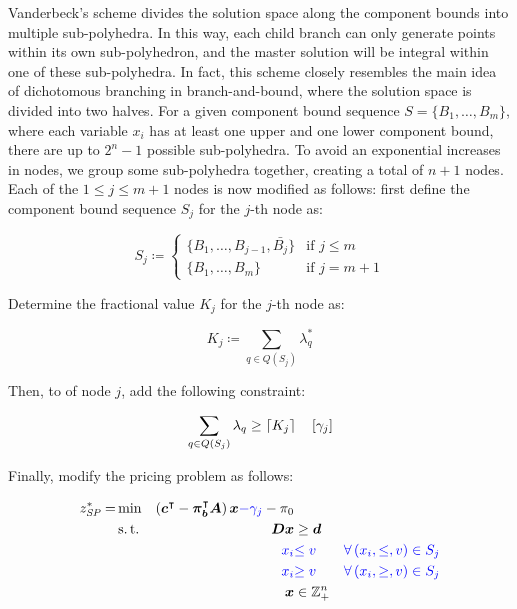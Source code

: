 Vanderbeck's scheme divides the solution space along the component bounds into multiple sub-polyhedra. In this way, each child branch can only generate points within its own sub-polyhedron, and the master solution will be integral within one of these sub-polyhedra. In fact, this scheme closely resembles the main idea of dichotomous branching in branch-and-bound, where the solution space is divided into two halves. For a given component bound sequence $S = \{B_1, \dots, B_m\}$, where each variable $x_i$ has at least one upper and one lower component bound, there are up to $2^n - 1$ possible sub-polyhedra. To avoid an exponential increases in nodes, we group some sub-polyhedra together, creating a total of $n + 1$ nodes. Each of the $1 \leq j \leq m+1$ nodes is now modified as follows: first define the component bound sequence $S_j$ for the $j$-th node as:

\begin{equation}
S_j \coloneqq
\begin{cases}
\{B_1, \dots, B_{j-1}, \bar{B_j}\} & \text{if } j \leq m \\
\{B_1, \dots, B_m\} & \text{if } j = m+1
\end{cases}
\end{equation}

Determine the fractional value $K_j$ for the $j$-th node as:

\begin{equation}
K_j \coloneqq \sum_{q \in Q(S_j)} \lambda_q^*
\end{equation}

Then, to \RMP{} of node $j$, add the following constraint:

\begin{equation}
\sum_{q \in Q(S_j)} \lambda_q \geq \lceil K_j\rceil \quad \left[\gamma_j\right]
\end{equation}

Finally, modify the pricing problem as follows:

\begin{equation}
\begin{aligned}
z^*_\SP{} = &\min & \left( \vec{c}\transpose - \vec{\pi}_\vec{b}\transpose \mat{A} \right) \vec{x} {\color{blue} - \gamma_j} - \pi_0 & \\
&\st & \mat{D} \vec{x} & \geq \vec{d} \\
&& {\color{blue} x_i} & {\color{blue} \leq v} & {\color{blue} \forall \left( x_i, \leq, v \right) \in S_j} \\
&& {\color{blue} x_i} & {\color{blue} \geq v} & {\color{blue} \forall \left( x_i, \geq, v \right) \in S_j} \\
&& \vec{x} & \in \mathbb{Z}_+^n
\end{aligned}
\end{equation}

